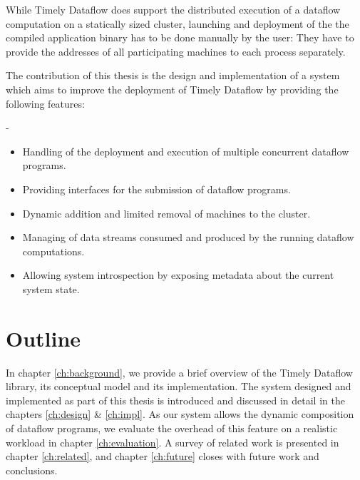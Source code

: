 While Timely Dataflow does support the distributed execution of a dataflow computation
on a statically sized cluster, launching and deployment of the the compiled
application binary has to be done manually by the user: They have to provide the
addresses of all participating machines to each process separately.

The contribution of this thesis is the design and implementation of a system which
aims to improve the deployment of Timely Dataflow by providing the following
features:

- 

\begin{itemize}
\item Handling of the deployment and execution of multiple concurrent dataflow programs.
\item Providing interfaces for the submission of dataflow programs.
\item Dynamic addition and limited removal of machines to the cluster.
\item Managing of data streams consumed and produced by the running dataflow computations.
\item Allowing system introspection by exposing metadata about the current system state.
\end{itemize}


\section{Outline}

In chapter \ref{ch:background}, we provide a brief overview of
the Timely Dataflow library, its conceptual model and its implementation. The
system designed and implemented as part of this thesis is introduced and
discussed in detail in the chapters \ref{ch:design} \& \ref{ch:impl}. As our
system allows the dynamic composition of dataflow programs, we evaluate the
overhead of this feature on a realistic workload in chapter \ref{ch:evaluation}.
A survey of related work is presented in chapter \ref{ch:related}, and chapter
\ref{ch:future} closes with future work and conclusions.
